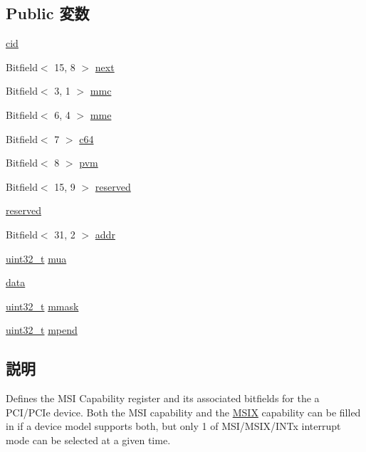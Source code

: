 \subsection*{Public 変数}
\begin{DoxyCompactItemize}
\item 
\hyperlink{structMSICAP_abc570b1db8821b4150cc5694fb524fca}{cid}
\item 
Bitfield$<$ 15, 8 $>$ \hyperlink{structMSICAP_a8bb6f66c6230d47ae653bb69bad27694}{next}
\item 
Bitfield$<$ 3, 1 $>$ \hyperlink{structMSICAP_a4a27e96090da8042a60766ea625bb797}{mmc}
\item 
Bitfield$<$ 6, 4 $>$ \hyperlink{structMSICAP_ad7519721bdd4a75f416d21a731ff99eb}{mme}
\item 
Bitfield$<$ 7 $>$ \hyperlink{structMSICAP_a28d5d81ebe7381ce856207a75c17bf71}{c64}
\item 
Bitfield$<$ 8 $>$ \hyperlink{structMSICAP_ac70f85dad2be90a16be83b36b3255f5b}{pvm}
\item 
Bitfield$<$ 15, 9 $>$ \hyperlink{structMSICAP_af8a210cfdab0375312b26552c8144f78}{reserved}
\item 
\hyperlink{structMSICAP_a66f538babc389986738ec70104e0562b}{reserved}
\item 
Bitfield$<$ 31, 2 $>$ \hyperlink{structMSICAP_a96c775fc45b25ef3a5d7c714a60f7d95}{addr}
\item 
\hyperlink{Type_8hh_a435d1572bf3f880d55459d9805097f62}{uint32\_\-t} \hyperlink{structMSICAP_a92338cdf88f1b13102045767d158cbdd}{mua}
\item 
\hyperlink{structMSICAP_a511ae0b1c13f95e5f08f1a0dd3da3d93}{data}
\item 
\hyperlink{Type_8hh_a435d1572bf3f880d55459d9805097f62}{uint32\_\-t} \hyperlink{structMSICAP_a4451ed58a365dd03be8ab56cc342b9ee}{mmask}
\item 
\hyperlink{Type_8hh_a435d1572bf3f880d55459d9805097f62}{uint32\_\-t} \hyperlink{structMSICAP_a685bd69c2511bc3608ff81274f9d98e4}{mpend}
\end{DoxyCompactItemize}


\subsection{説明}
Defines the MSI Capability register and its associated bitfields for the a PCI/PCIe device. Both the MSI capability and the \hyperlink{structMSIX}{MSIX} capability can be filled in if a device model supports both, but only 1 of MSI/MSIX/INTx interrupt mode can be selected at a given time. 

